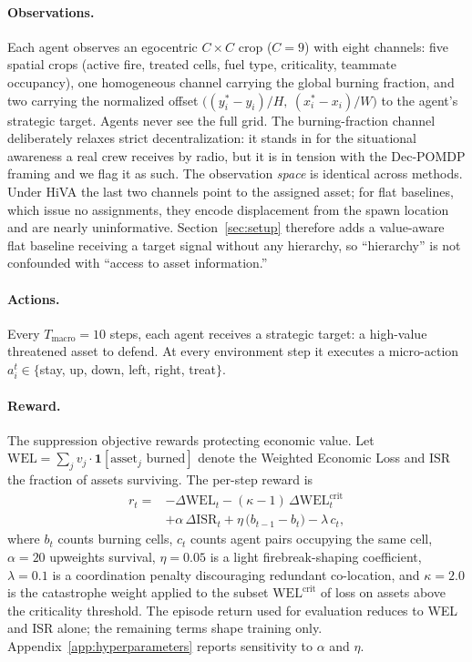\documentclass[letterpaper]{article}
\begin{document}
\paragraph{Observations.} Each agent observes an egocentric $C \times C$ crop ($C = 9$) with eight channels: five spatial crops (active fire, treated cells, fuel type, criticality, teammate occupancy), one homogeneous channel carrying the global burning fraction, and two carrying the normalized offset $\bigl((y_i^*-y_i)/H,\ (x_i^*-x_i)/W\bigr)$ to the agent's strategic target. Agents never see the full grid. The burning-fraction channel deliberately relaxes strict decentralization: it stands in for the situational awareness a real crew receives by radio, but it is in tension with the Dec-POMDP framing and we flag it as such. The observation \emph{space} is identical across methods. Under HiVA the last two channels point to the assigned asset; for flat baselines, which issue no assignments, they encode displacement from the spawn location and are nearly uninformative. Section~\ref{sec:setup} therefore adds a value-aware flat baseline receiving a target signal without any hierarchy, so ``hierarchy'' is not confounded with ``access to asset information.''

\paragraph{Actions.} Every $T_{\text{macro}} = 10$ steps, each agent receives a strategic target: a high-value threatened asset to defend. At every environment step it executes a micro-action $a_i^t \in \{$stay, up, down, left, right, treat$\}$.

\paragraph{Reward.} The suppression objective rewards protecting economic value. Let $\text{WEL} = \sum_j v_j \cdot \mathbf{1}[\text{asset}_j \text{ burned}]$ denote the Weighted Economic Loss and $\text{ISR}$ the fraction of assets surviving. The per-step reward is
\begin{equation}
\label{eq:reward}
\begin{split}
r_t = {}& -\Delta \text{WEL}_t - (\kappa-1)\,\Delta \text{WEL}^{\text{crit}}_t \\
        & + \alpha\, \Delta \text{ISR}_t + \eta\,\bigl(b_{t-1} - b_t\bigr) - \lambda\, c_t ,
\end{split}
\end{equation}
where $b_t$ counts burning cells, $c_t$ counts agent pairs occupying the same cell, $\alpha = 20$ upweights survival, $\eta = 0.05$ is a light firebreak-shaping coefficient, $\lambda = 0.1$ is a coordination penalty discouraging redundant co-location, and $\kappa = 2.0$ is the catastrophe weight applied to the subset $\text{WEL}^{\text{crit}}$ of loss on assets above the criticality threshold. The episode return used for evaluation reduces to WEL and ISR alone; the remaining terms shape training only. Appendix~\ref{app:hyperparameters} reports sensitivity to $\alpha$ and $\eta$.
\end{document}

